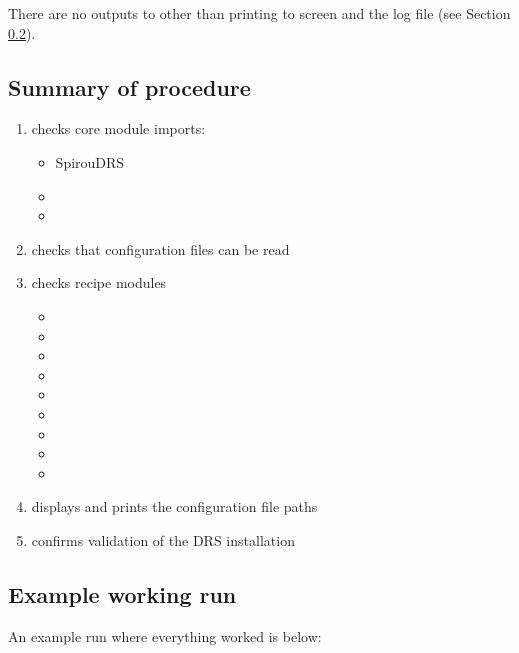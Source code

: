 There are no outputs to \calvalidate other than printing to screen and the log file (see Section \ref{ch:the_recipes:cal_validate_spirou:example_run}).

\subsection{Summary of procedure}
\begin{enumerate}
\item checks core module imports:
	\begin{itemize}
	\item SpirouDRS
	\item \spirouConfig
	\item \spirouCore
	\end{itemize}
\item checks that configuration files can be read
\item checks recipe modules
	\begin{itemize}
	\item \spirouBACK
	\item \spirouCDB
	\item \spirouEXTOR
	\item \spirouFLAT
	\item \spirouImage
	\item \spirouLOCOR
	\item \spirouRV
	\item \spirouStartup
	\item \spirouTHORCA
	\end{itemize}
\item displays and prints the configuration file paths
\item confirms validation of the DRS installation
\end{enumerate}

\newpage
\subsection{Example working run}
\label{ch:the_recipes:cal_validate_spirou:example_run}

An example run where everything worked is below:

